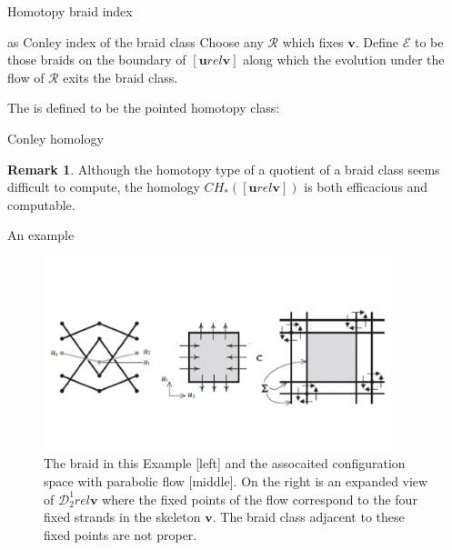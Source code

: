 \documentclass[9pt, english]{beamer}
\theoremstyle{definition}
\newtheorem{oss}[thm]{Remark}
\newcommand{\simbolovettore}[1]{{\boldsymbol{#1}}}
\newcommand{\vh}{\simbolovettore{h}}
\newcommand{\vu}{\simbolovettore{u}}
\newcommand{\vv}{\simbolovettore{v}}
\begin{document}
\begin{frame}{Homotopy braid index}
    \begin{block}{as Conley index of the braid class}\pause
        Choose any $\mathcal R$ which fixes $\vv$. Define $\mathcal E$
        to be those braids on the boundary of $[\vu rel \vv]$ along
        which the evolution under the flow of $\mathcal R$ exits the
        braid class.\pause

        The {\color{red}{homotopy braid index}\/} is defined to be the pointed homotopy
        class:\pause
        {\color{blue}{
        \[
        \vh([\vu rel\vv]):=([\vu rel \vv]/\mathcal E, \{\mathcal E\}).
        \]}\/}
    \end{block}
\end{frame}
\begin{frame}{Conley homology}
    \begin{oss}
    Although the homotopy type of a quotient of a braid class seems
    difficult to compute, the homology $CH_*([\vu rel \vv])$ is both
    \alert{efficacious} and \alert{computable}.
    \end{oss}
\end{frame}
\begin{frame}{An example}
\begin{figure}\label{fig:example}
        \includegraphics[width=0.9\textwidth]{images/Fig5Inventiones2.pdf}\caption{The braid in this Example [left]
        and the assocaited configuration space with parabolic flow [middle]. On the right is an expanded view
         of $\mathcal D_2^1 rel \vv$ where the fixed points of the flow correspond to the four fixed strands in the
         skeleton $\vv$. The braid class adjacent to these fixed points are not proper.}
        \end{figure}
\end{frame}
\end{document}
